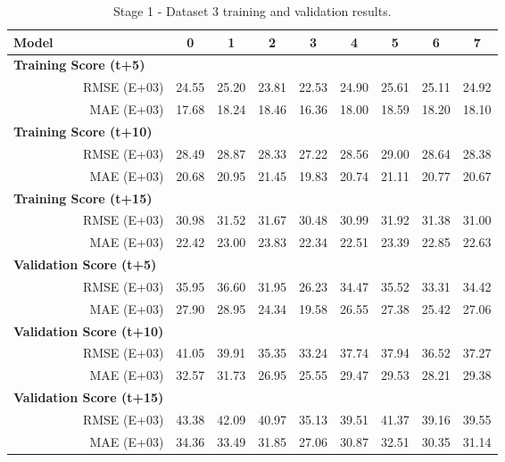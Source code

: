 \begin{table}[htbp]
  \centering
  \caption{Stage 1 - Dataset 3 training and validation results.}
    \begin{tabular}{cr|cccccccc}
    \toprule
    \multicolumn{1}{l}{\textbf{Model}} &       & 0     & 1     & 2     & 3     & 4     & 5     & 6     & 7 \\
    \midrule
    \multicolumn{2}{l|}{\textbf{Training Score (t+5)}} &       &       &       &       &       &       &       &  \\
          & RMSE (E+03) & 24.55 & 25.20 & 23.81 & 22.53 & 24.90 & 25.61 & 25.11 & 24.92 \\
          & MAE (E+03) & 17.68 & 18.24 & 18.46 & 16.36 & 18.00 & 18.59 & 18.20 & 18.10 \\
    \multicolumn{2}{l|}{\textbf{Training Score (t+10)}} &       &       &       &       &       &       &       &  \\
          & RMSE (E+03) & 28.49 & 28.87 & 28.33 & 27.22 & 28.56 & 29.00 & 28.64 & 28.38 \\
          & MAE (E+03) & 20.68 & 20.95 & 21.45 & 19.83 & 20.74 & 21.11 & 20.77 & 20.67 \\
    \multicolumn{2}{l|}{\textbf{Training Score (t+15)}} &       &       &       &       &       &       &       &  \\
          & RMSE (E+03) & 30.98 & 31.52 & 31.67 & 30.48 & 30.99 & 31.92 & 31.38 & 31.00 \\
          & MAE (E+03) & 22.42 & 23.00 & 23.83 & 22.34 & 22.51 & 23.39 & 22.85 & 22.63 \\
    \midrule
    \multicolumn{2}{l|}{\textbf{Validation Score (t+5)}} &       &       &       &       &       &       &       &  \\
          & RMSE (E+03) & 35.95 & 36.60 & 31.95 & 26.23 & 34.47 & 35.52 & 33.31 & 34.42 \\
          & MAE (E+03) & 27.90 & 28.95 & 24.34 & 19.58 & 26.55 & 27.38 & 25.42 & 27.06 \\
    \multicolumn{2}{l|}{\textbf{Validation Score (t+10)}} &       &       &       &       &       &       &       &  \\
          & RMSE (E+03) & 41.05 & 39.91 & 35.35 & 33.24 & 37.74 & 37.94 & 36.52 & 37.27 \\
          & MAE (E+03) & 32.57 & 31.73 & 26.95 & 25.55 & 29.47 & 29.53 & 28.21 & 29.38 \\
    \multicolumn{2}{l|}{\textbf{Validation Score (t+15)}} &       &       &       &       &       &       &       &  \\
          & RMSE (E+03) & 43.38 & 42.09 & 40.97 & 35.13 & 39.51 & 41.37 & 39.16 & 39.55 \\
          & MAE (E+03) & 34.36 & 33.49 & 31.85 & 27.06 & 30.87 & 32.51 & 30.35 & 31.14 \\
    \end{tabular}%
  \label{table6}%
\end{table}%

